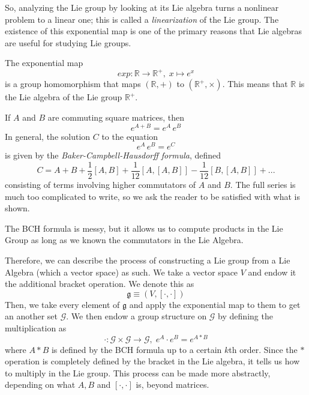 \documentclass{article}
\begin{document}
    \begin{center}
    \end{center}
    So, analyzing the Lie group by looking at its Lie algebra turns a nonlinear problem to a linear one; this is called a \textit{linearization} of the Lie group. The existence of this exponential map is one of the primary reasons that Lie algebras are useful for studying Lie groups. 
    \begin{example}
    The exponential map 
    \[exp: \mathbb{R} \longrightarrow \mathbb{R}^+, \; x \mapsto e^x\]
    is a group homomorphism that maps $(\mathbb{R}, +)$ to $(\mathbb{R}^+, \times)$. This means that $\mathbb{R}$ is the Lie algebra of the Lie group $\mathbb{R}^+$. 
    \end{example}

    \begin{theorem}
    If $A$ and $B$ are commuting square matrices, then 
    \[e^{A + B} = e^A \, e^B\]
    In general, the solution $C$ to the equation
    \[e^{A} \, e^B = e^C\]
    is given by the \textit{Baker-Campbell-Hausdorff formula}, defined
    \[C = A + B + \frac{1}{2}[A,B] + \frac{1}{12} [A,[A,B]] - \frac{1}{12} [B,[A,B]] + ...\]
    consisting of terms involving higher commutators of $A$ and $B$. The full series is much too complicated to write, so we ask the reader to be satisfied with what is shown. 
    \end{theorem}
    The BCH formula is messy, but it allows us to compute products in the Lie Group as long as we known the commutators in the Lie Algebra. 

    Therefore, we can describe the process of constructing a Lie group from a Lie Algebra (which a vector space) as such. We take a vector space $V$ and endow it the additional bracket operation. We denote this as
    \[\mathfrak{g} \equiv (V, [\cdot, \cdot])\]
    Then, we take every element of $\mathfrak{g}$ and apply the exponential map to them to get an another set $\mathcal{G}$. We then endow a group structure on $\mathcal{G}$ by defining the multiplication as 
    \[\cdot: \mathcal{G} \times \mathcal{G} \longrightarrow \mathcal{G}, \; e^A \cdot e^B = e^{A * B}\]
    where $A*B$ is defined by the BCH formula up to a certain $k$th order. Since the $*$ operation is completely defined by the bracket in the Lie algebra, it tells us how to multiply in the Lie group. This process can be made more abstractly, depending on what $A, B$ and $[\cdot,\cdot]$ is, beyond matrices. 
\end{document}
